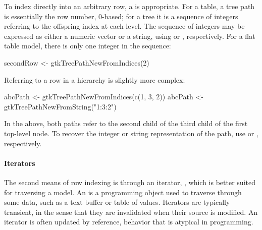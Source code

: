 To index directly into an arbitrary row, a  is
appropriate. For a table, a tree path is essentially the row number,
$0$-based; for a tree it is a sequence of integers referring to the
offspring index at each level. The sequence of integers may be
expressed as either a numeric vector or a string, using
 or
, respectively. For a flat table
model, there is only one integer in the sequence:
\begin{Schunk}
\begin{Sinput}
 secondRow <- gtkTreePathNewFromIndices(2)
\end{Sinput}
\end{Schunk}
%
Referring to a row in a hierarchy is slightly more complex:
\begin{Schunk}
\begin{Sinput}
 abcPath <- gtkTreePathNewFromIndices(c(1, 3, 2))
 abcPath <- gtkTreePathNewFromString("1:3:2")
\end{Sinput}
\end{Schunk}
%
In the above, both paths refer to the second child of the third child
of the first top-level node. To recover the integer or string
representation of the path, use  or
, respectively.

\paragraph{Iterators}
 The second means of row indexing is through an
iterator, , which is better suited for traversing a
model.  An  is a programming object used to traverse through some data, such as a text buffer
or table of values. Iterators are typically transient, in the sense
that they are invalidated when their source is modified. An iterator
is often updated by reference, behavior that is
atypical in \R\/ programming.


